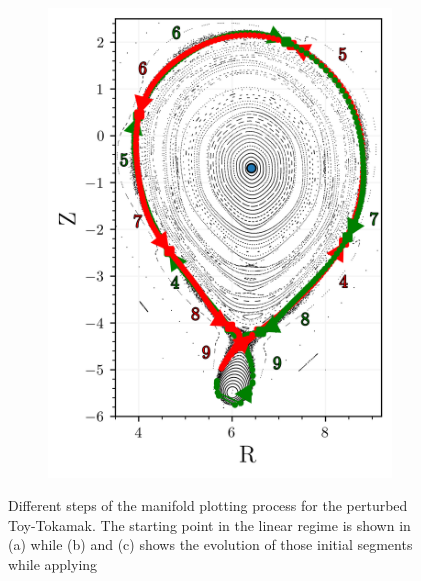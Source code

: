 \begin{figure}[H]
\begin{minipage}{0.45\textwidth}
\begin{subfigure}[b]{0.99\textwidth}
            \caption{}
            \label{fig:man-b}
        \end{subfigure}
    \end{minipage}%
    \begin{minipage}{0.5\textwidth} %
        \centering
        \begin{subfigure}[b]{\textwidth}
            \centering
            \includegraphics[width=\textwidth]{images/manifold/manifold.png}
            \caption{}
            \label{fig:man-c}
        \end{subfigure}
    \end{minipage}
    \caption{Different steps of the manifold plotting process for the perturbed Toy-Tokamak. The starting point in the linear regime is shown in (a) while (b) and (c) shows the evolution of those initial segments while applying  }
    \label{fig:manifold-algo}
\end{figure}

